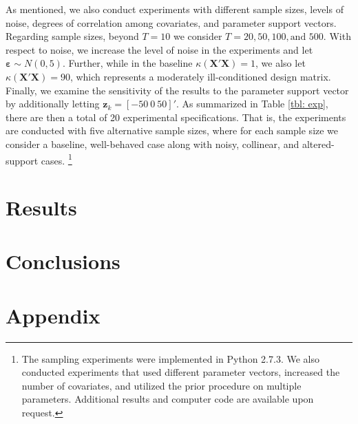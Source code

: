 \documentclass[english]{article}
\begin{document}
As mentioned, we also conduct experiments with different sample sizes, 
levels of noise, degrees of correlation among covariates, and parameter 
support vectors.
Regarding sample sizes, beyond $T=10$ we consider $T=20, 50, 100, 
\text{and } 500$. 
With respect to noise, we increase the level of noise in the experiments and 
let $\mathbf{\varepsilon}\sim N(0,5)$.
Further, while in the baseline $\kappa(\mathbf{X}'\mathbf{X})=1$, we
also let $\kappa(\mathbf{X}'\mathbf{X})=90$, which represents a 
moderately ill-conditioned design matrix.
Finally, we examine the sensitivity of the results to the parameter support
vector by additionally letting $\mathbf{z}_k = [- 50 ~ 0 ~ 50]'$.
As summarized in Table \ref{tbl: exp}, there are then a total of 20 
experimental specifications. 
That is, the experiments are conducted with five alternative sample sizes, 
where for each sample size we consider a baseline, well-behaved case along
with noisy, collinear, and altered-support cases.%
\footnote{The sampling experiments were implemented in Python 
2.7.3. 
We also conducted experiments that used different parameter vectors, 
increased the number of covariates, and utilized the prior procedure on
multiple parameters.
Additional results and computer code are available upon request.}


\section{Results}
\label{sec: results}


\section{Conclusions}
\label{sec: conc}


\newpage
\section*{Appendix}
\label{sec: appendix}
\end{document}
